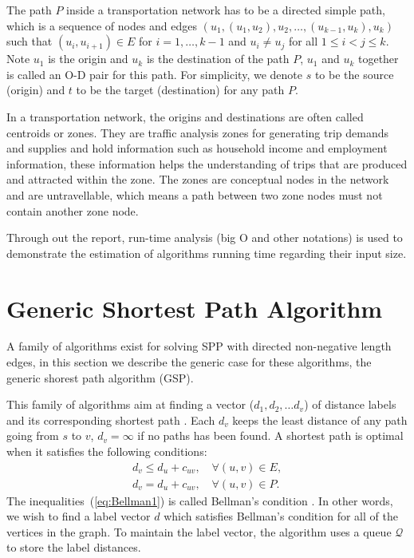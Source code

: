 The path $P$ inside a transportation network has to be a directed simple path, 
which is a sequence of nodes and edges $ (u_1, (u_1, u_2), u_2, \ldots , (u_{k-1}, u_k), u_k ) $
such that $ (u_i, u_{i+1}) \in E$ for $i = 1,\ldots,k-1$ and $u_i \neq u_j$ for all $ 1 \leq i < j \leq k$.
Note $u_1$ is the origin and $u_k$ is the destination of the path $P$, $u_1$ and $u_k$ together is called an O-D pair for this path.
For simplicity, we denote $s$ to be the source (origin) and $t$ to be the target (destination) for any path $P$.

In a transportation network,
the origins and destinations are often called centroids or zones.
They are traffic analysis zones for generating trip demands and supplies
and hold information such as household income and employment information,
these information helps the understanding of trips that are produced and attracted within the zone.
The zones are conceptual nodes in the network and are untravellable,
which means a path between two zone nodes must not contain another zone node.

Through out the report,
run-time analysis (big O and other notations) is used to demonstrate the estimation of algorithms running time regarding their input size. 

\section{Generic Shortest Path Algorithm}
A family of algorithms exist for solving SPP with directed non-negative length edges,
in this section we describe the generic case for these
algorithms, the generic shorest path algorithm (GSP).

This family of algorithms aim at finding a 
vector ($d_1, d_2,\dots d_v$) of distance labels and its corresponding shortest path \citep{Klunder}.
Each $d_v$ keeps the least distance of any path going from $s$ to $v$, $d_v = \infty$ if no paths has been found.
A shortest path is optimal when it satisfies the following conditions:
\begin{align}
    d_v \leq d_u + c_{uv}, \quad \forall(u,v) \in E, \label{eq:Bellman1}\\
    d_v  =   d_u + c_{uv}, \quad \forall(u,v) \in P.
\end{align}
The inequalities~(\ref{eq:Bellman1}) is called Bellman's condition \citep{Bellman}.
In other words,
we wish to find a label vector $d$ which satisfies Bellman's condition for all of the vertices in the graph.
To maintain the label vector, the algorithm uses a queue $\mathcal{Q}$ to store the label distances.

